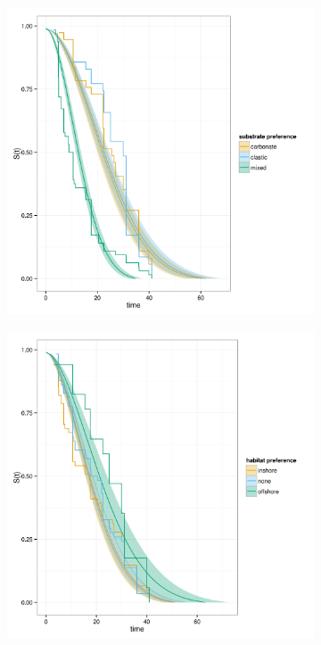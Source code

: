 \documentclass[12pt,letterpaper]{article}
\begin{document}
\begin{figure}[ht]
    \begin{subfigure}[b]{0.5\textwidth}
      \caption{}
      \includegraphics[height = 0.4\textheight, keepaspectratio = true]{figure/aff}
      \label{subfig:aff_surv}
    \end{subfigure}
    \begin{subfigure}[b]{0.5\textwidth}
      \caption{}
      \includegraphics[height = 0.4\textheight, keepaspectratio = true]{figure/env}

\end{subfigure}
\end{figure}
\end{document}
